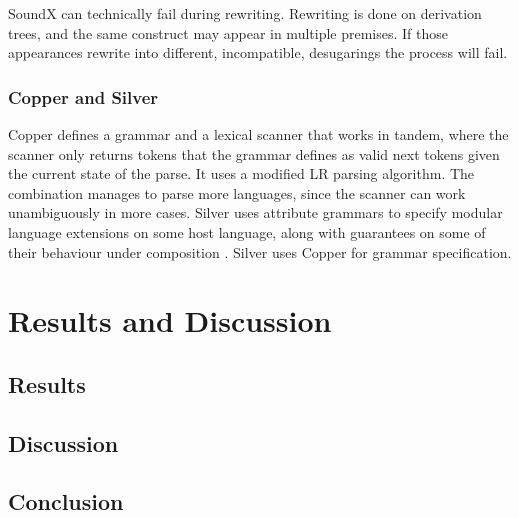 \documentclass{kththesis}
\begin{document}
SoundX can technically fail during rewriting. Rewriting is done on derivation trees, and the same construct may appear in multiple premises. If those appearances rewrite into different, incompatible, desugarings the process will fail.

\subsection{Copper and Silver}

Copper \cite{VanWyk2007} defines a grammar and a lexical scanner that works in tandem, where the scanner only returns tokens that the grammar defines as valid next tokens given the current state of the parse. It uses a modified LR parsing algorithm. The combination manages to parse more languages, since the scanner can work unambiguously in more cases. Silver \cite{VanWyk2010} uses attribute grammars to specify modular language extensions on some host language, along with guarantees on some of their behaviour under composition \cite{Kaminski2017}. Silver uses Copper for grammar specification.

\chapter{Results and Discussion}

\section{Results}

\section{Discussion}

\section{Conclusion}

\printbibliography[heading=bibintoc]


\end{document}
